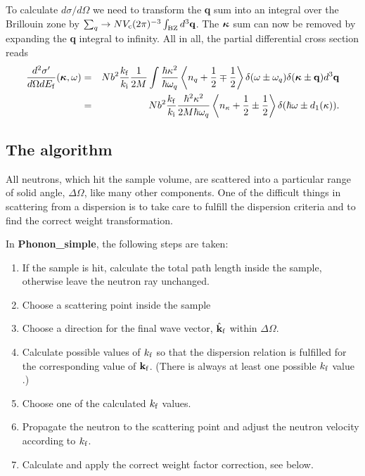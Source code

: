 To calculate $d\sigma/d\Omega$ we need to transform the
{\bf q} sum into an integral over the Brillouin zone by
$\sum_q \rightarrow N V_{\rm c} (2\pi)^{-3} \int_{\rm BZ} d^3{\bf q}$.
The $\mbox{\boldmath $\kappa$}$ sum can now be removed by
expanding the {\bf q} integral to infinity.
All in all, the partial differential cross section reads
\begin{eqnarray}
\frac{d^2\sigma'}{d\Omega dE_{\rm f}}
  (\mbox{\boldmath $\kappa$},\omega) &=&
  N b^2 \frac{k_{\rm f}}{k_{\rm i}} \frac{1}{2M}
  \int \frac{\hbar \kappa^2}{\hbar \omega_q}
  \left\langle n_{q}+\frac{1}{2}\mp\frac{1}{2} \right\rangle
  \delta(\omega\pm\omega_{q}) \delta(\mbox{\boldmath $\kappa$}\pm{\bf q})
   d^3{\bf q} \nonumber \\
 &=& N b^2 \frac{k_{\rm f}}{k_{\rm i}}
          \frac{\hbar^2 \kappa^2}{2M \hbar \omega_q}
  \left\langle n_{\kappa}+\frac12\pm\frac12 \right\rangle
  \delta(\hbar\omega\pm d_1(\kappa)) . \label{e:phonon-pdcross}
\end{eqnarray}

\subsection{The algorithm}
All neutrons, which hit the sample volume, are scattered
into a particular range of solid angle, $\Delta \Omega$,
like many other components. One of the difficult things in
scattering from a dispersion is to take care to fulfill the
dispersion criteria and to find the correct weight transformation.

In {\bf Phonon\_simple}, the following steps are taken:
\begin{enumerate}
\item If the sample is hit, calculate the total path length inside the
sample, otherwise leave the neutron ray unchanged.
\item Choose a scattering point inside the sample
\item Choose a direction for the final wave vector, $\hat{\bf k}_{\rm f}$
within $\Delta\Omega$.
\item Calculate possible values of $k_{\rm f}$ so that the
dispersion relation is fulfilled for the corresponding value
of ${\bf k}_{\rm f}$. (There is always at least one possible $k_{\rm f}$
value \cite{bacon}.)
\item Choose one of the calculated $k_{\rm f}$ values.
\item Propagate the neutron to the scattering point and adjust the
neutron velocity according to $k_{\rm f}$.
\item Calculate and apply the correct weight factor correction, see below.
\end{enumerate}


